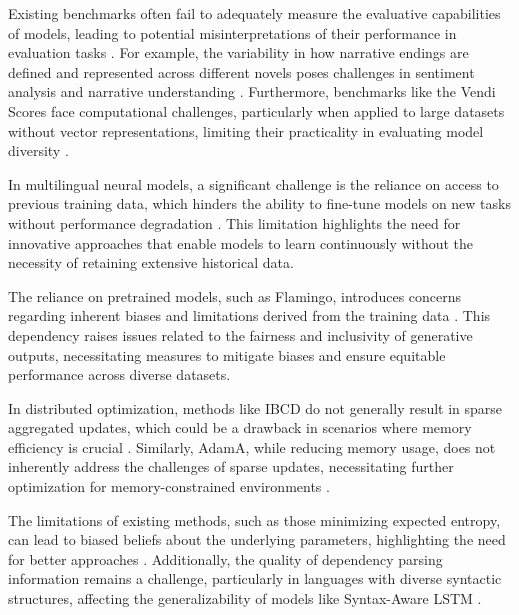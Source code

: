Existing benchmarks often fail to adequately measure the evaluative capabilities of models, leading to potential misinterpretations of their performance in evaluation tasks \cite{oh2024generativeaiparadoxevaluation}. For example, the variability in how narrative endings are defined and represented across different novels poses challenges in sentiment analysis and narrative understanding \cite{jannidis2016analyzingfeaturesdetectionhappy}. Furthermore, benchmarks like the Vendi Scores face computational challenges, particularly when applied to large datasets without vector representations, limiting their practicality in evaluating model diversity \cite{pasarkar2024cousinsvendiscorefamily}.



In multilingual neural models, a significant challenge is the reliance on access to previous training data, which hinders the ability to fine-tune models on new tasks without performance degradation \cite{zhao2022lifelonglearningmultilingualneural}. This limitation highlights the need for innovative approaches that enable models to learn continuously without the necessity of retaining extensive historical data.



The reliance on pretrained models, such as Flamingo, introduces concerns regarding inherent biases and limitations derived from the training data \cite{alayrac2022flamingo}. This dependency raises issues related to the fairness and inclusivity of generative outputs, necessitating measures to mitigate biases and ensure equitable performance across diverse datasets.



In distributed optimization, methods like IBCD do not generally result in sparse aggregated updates, which could be a drawback in scenarios where memory efficiency is crucial \cite{mishchenko201999distributedoptimizationwaste}. Similarly, AdamA, while reducing memory usage, does not inherently address the challenges of sparse updates, necessitating further optimization for memory-constrained environments \cite{zhang2023adamaccumulationreducememory}.



The limitations of existing methods, such as those minimizing expected entropy, can lead to biased beliefs about the underlying parameters, highlighting the need for better approaches \cite{kulick2015advantagecrossentropyentropy}. Additionally, the quality of dependency parsing information remains a challenge, particularly in languages with diverse syntactic structures, affecting the generalizability of models like Syntax-Aware LSTM \cite{qian2017syntaxawarelstmmodel}.



